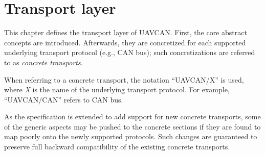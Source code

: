 \chapter{Transport layer}\label{sec:transport}

This chapter defines the transport layer of UAVCAN.
First, the core abstract concepts are introduced.
Afterwards, they are concretized for each supported underlying transport protocol (e.g., CAN bus);
such concretizations are referred to as \emph{concrete transports}.

When referring to a concrete transport, the notation ``UAVCAN/X'' is used,
where \emph{X} is the name of the underlying transport protocol.
For example, ``UAVCAN/CAN'' refers to CAN bus.

As the specification is extended to add support for new concrete transports,
some of the generic aspects may be pushed to the concrete sections
if they are found to map poorly onto the newly supported protocols.
Such changes are guaranteed to preserve full backward compatibility of the existing concrete transports.

\clearpage
\clearpage
